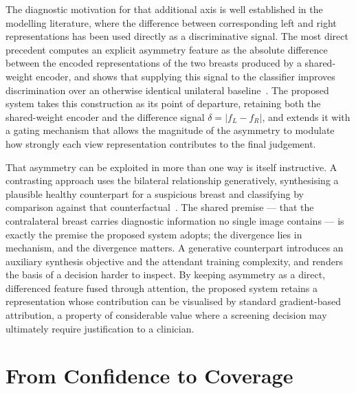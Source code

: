 \documentclass[12pt, a4paper]{article}
\begin{document}
The diagnostic motivation for that additional axis is well established in
the modelling literature, where the difference between corresponding left
and right representations has been used directly as a discriminative
signal. The most direct precedent computes an explicit asymmetry feature as
the absolute difference between the encoded representations of the two
breasts produced by a shared-weight encoder, and shows that supplying this
signal to the classifier improves discrimination over an otherwise
identical unilateral baseline~\cite{Nguyen2019}. The proposed system takes
this construction as its point of departure, retaining both the
shared-weight encoder and the difference signal \( \delta = |f_L - f_R| \),
and extends it with a gating mechanism that allows the magnitude of the
asymmetry to modulate how strongly each view representation contributes to
the final judgement.

That asymmetry can be exploited in more than one way is itself instructive.
A contrasting approach uses the bilateral relationship generatively,
synthesising a plausible healthy counterpart for a suspicious breast and
classifying by comparison against that counterfactual~\cite{Yang2021}. The
shared premise --- that the contralateral breast carries diagnostic
information no single image contains --- is exactly the premise the proposed
system adopts; the divergence lies in mechanism, and the divergence matters.
A generative counterpart introduces an auxiliary synthesis objective and the
attendant training complexity, and renders the basis of a decision harder to
inspect. By keeping asymmetry as a direct, differenced feature fused through
attention, the proposed system retains a representation whose contribution
can be visualised by standard gradient-based attribution, a property of
considerable value where a screening decision may ultimately require
justification to a clinician.

\section{From Confidence to Coverage}
\end{document}
